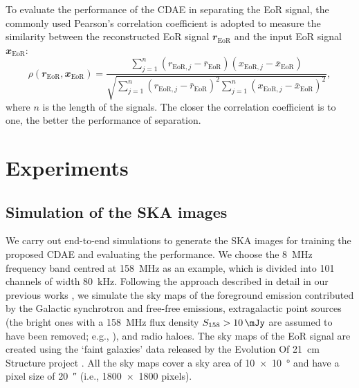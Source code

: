 \documentclass[letters,a4paper,fleqn,usenatbib]{mnras}
\newcommand{\R}[1]{\mathrm{#1}}
\newcommand{\B}[1]{\mathbfit{#1}}
\begin{document}
To evaluate the performance of the CDAE in separating the EoR signal,
the commonly used Pearson's correlation coefficient
\citep[e.g.,][]{harker2009,chapman2013}
is adopted to measure the similarity between the reconstructed EoR
signal $\B{r}_{\R{EoR}}$ and the input EoR signal $\B{x}_{\R{EoR}}$:
\begin{equation}
  \label{eq:corrcoef}
  \rho(\B{r}_{\R{EoR}}, \B{x}_{\R{EoR}}) =
    \frac{\sum_{j=1}^{n}(r_{\R{EoR},j} - \bar{r}_{\R{EoR}})
      (x_{\R{EoR},j} - \bar{x}_{\R{EoR}})}{
        \sqrt{\sum_{j=1}^{n}(r_{\R{EoR},j} - \bar{r}_{\R{EoR}})^2
          \sum_{j=1}^{n}(x_{\R{EoR},j} - \bar{x}_{\R{EoR}})^2}
    },
\end{equation}
where $n$ is the length of the signals.
The closer the correlation coefficient is to one, the better the
performance of separation.


\section{Experiments}
\label{sec:experiments}

\subsection{Simulation of the SKA images}
\label{sec:simulation}

We carry out end-to-end simulations to generate the SKA images for
training the proposed CDAE and evaluating the performance.
We choose the \SI{8}{\MHz} frequency band centred at \SI{158}{\MHz} as
an example, which is divided into 101 channels of width \SI{80}{\kHz}.
Following the approach described in detail in our previous works
\citep{wang2010,wang2013}, we simulate the sky maps of the foreground
emission contributed by the Galactic synchrotron and free-free
emissions, extragalactic point sources (the bright ones with a
\SI{158}{\MHz} flux density $S_{158} > \SI{10}{\mJy}$ are assumed to
have been removed; e.g., \citealt{liu2009ps}), and radio haloes.
The sky maps of the EoR signal are created using the `faint galaxies'
data released by the Evolution Of 21~cm Structure project
\citep{mesinger2016}.
All the sky maps cover a sky area of \SI{10 x 10}{\degree} and have
a pixel size of \SI{20}{\arcsecond} (i.e., \num{1800 x 1800} pixels).
\end{document}
